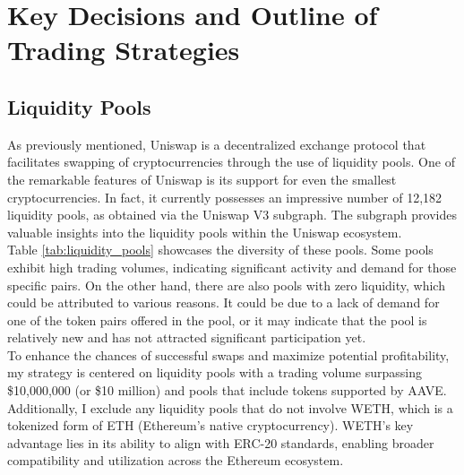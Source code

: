 \chapter{Key Decisions and Outline of Trading Strategies}

\section{Liquidity Pools} \label{sec:liquidity-pools}
As previously mentioned, Uniswap is a decentralized exchange protocol that facilitates swapping of cryptocurrencies through the use of liquidity pools. One of the remarkable features of Uniswap is its support for even the smallest cryptocurrencies. In fact, it currently possesses an impressive number of 12,182 liquidity pools, as obtained via the Uniswap V3 subgraph. The subgraph provides valuable insights into the liquidity pools within the Uniswap ecosystem.
\\[5mm]
Table \ref{tab:liquidity_pools} showcases the diversity of these pools. Some pools exhibit high trading volumes, indicating significant activity and demand for those specific pairs. On the other hand, there are also pools with zero liquidity, which could be attributed to various reasons. It could be due to a lack of demand for one of the token pairs offered in the pool, or it may indicate that the pool is relatively new and has not attracted significant participation yet.
\\[5mm]
To enhance the chances of successful swaps and maximize potential profitability, my strategy is centered on liquidity pools with a trading volume surpassing \$10,000,000 (or \$10 million) and pools that include tokens supported by AAVE. Additionally, I exclude any liquidity pools that do not involve WETH, which is a tokenized form of ETH (Ethereum's native cryptocurrency). WETH's key advantage lies in its ability to align with ERC-20 standards, enabling broader compatibility and utilization across the Ethereum ecosystem.

